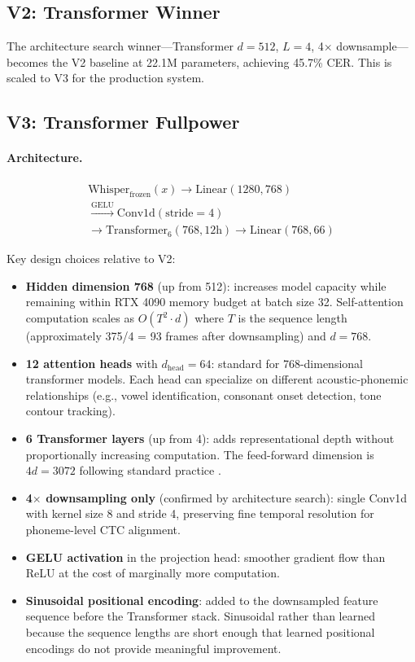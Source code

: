 \documentclass[11pt]{article}
\begin{document}
\subsection{V2: Transformer Winner}

The architecture search winner---Transformer $d{=}512$, $L{=}4$, 4$\times$ downsample---becomes the V2 baseline at 22.1M parameters, achieving 45.7\% CER.
This is scaled to V3 for the production system.

\subsection{V3: Transformer Fullpower}
\label{sec:v3}

\paragraph{Architecture.}
\begin{multline}
\text{Whisper}_{\text{frozen}}(x) \to \text{Linear}(1280, 768) \\
\xrightarrow{\text{GELU}} \text{Conv1d}(\text{stride}{=}4) \\
\to \text{Transformer}_6(768, 12\text{h}) \to \text{Linear}(768, 66)
\end{multline}

Key design choices relative to V2:
\begin{itemize}
\item \textbf{Hidden dimension 768} (up from 512): increases model capacity while remaining within RTX 4090 memory budget at batch size 32.
Self-attention computation scales as $O(T^2 \cdot d)$ where $T$ is the sequence length (approximately 375/4 = 93 frames after downsampling) and $d = 768$.
\item \textbf{12 attention heads} with $d_{\text{head}} = 64$: standard for 768-dimensional transformer models. Each head can specialize on different acoustic-phonemic relationships (e.g., vowel identification, consonant onset detection, tone contour tracking).
\item \textbf{6 Transformer layers} (up from 4): adds representational depth without proportionally increasing computation. The feed-forward dimension is $4d = 3072$ following standard practice \cite{vaswani2017attention}.
\item \textbf{4$\times$ downsampling only} (confirmed by architecture search): single Conv1d with kernel size 8 and stride 4, preserving fine temporal resolution for phoneme-level CTC alignment.
\item \textbf{GELU activation} in the projection head: smoother gradient flow than ReLU at the cost of marginally more computation.
\item \textbf{Sinusoidal positional encoding}: added to the downsampled feature sequence before the Transformer stack. Sinusoidal rather than learned because the sequence lengths are short enough that learned positional encodings do not provide meaningful improvement.
\end{itemize}
\end{document}
